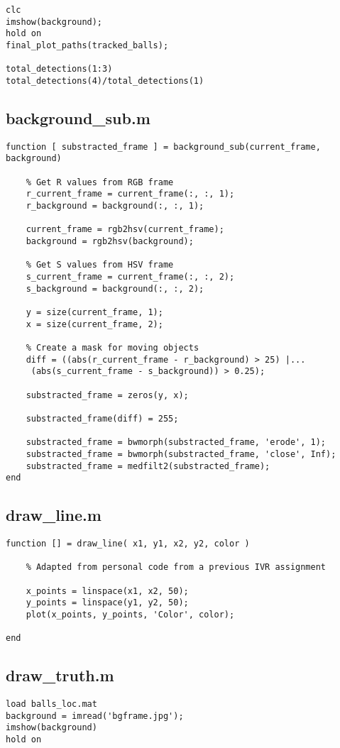 \documentclass[12pt,a4paper]{article}
\begin{document}
\begin{appendices}
\begin{verbatim}
clc
imshow(background);
hold on
final_plot_paths(tracked_balls);

total_detections(1:3)
total_detections(4)/total_detections(1)
\end{verbatim}

\subsection{background\_sub.m}
\begin{verbatim}
function [ substracted_frame ] = background_sub(current_frame, background)

    % Get R values from RGB frame
    r_current_frame = current_frame(:, :, 1);
    r_background = background(:, :, 1);
    
    current_frame = rgb2hsv(current_frame);
    background = rgb2hsv(background);
    
    % Get S values from HSV frame
    s_current_frame = current_frame(:, :, 2);
    s_background = background(:, :, 2);
    
    y = size(current_frame, 1);
    x = size(current_frame, 2);
    
    % Create a mask for moving objects
    diff = ((abs(r_current_frame - r_background) > 25) |...
     (abs(s_current_frame - s_background)) > 0.25);
    
    substracted_frame = zeros(y, x);
    
    substracted_frame(diff) = 255;
    
    substracted_frame = bwmorph(substracted_frame, 'erode', 1);
    substracted_frame = bwmorph(substracted_frame, 'close', Inf);
    substracted_frame = medfilt2(substracted_frame);
end
\end{verbatim}

\subsection{draw\_line.m}
\begin{verbatim}
function [] = draw_line( x1, y1, x2, y2, color )

    % Adapted from personal code from a previous IVR assignment
	
    x_points = linspace(x1, x2, 50);  
    y_points = linspace(y1, y2, 50); 
    plot(x_points, y_points, 'Color', color);
    
end
\end{verbatim}

\subsection{draw\_truth.m}
\begin{verbatim}
load balls_loc.mat
background = imread('bgframe.jpg');
imshow(background)
hold on


\end{verbatim}
\end{appendices}
\end{document}
